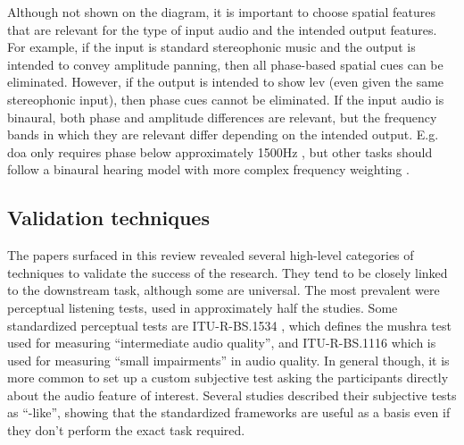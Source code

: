 \documentclass[referee,pdflatex,sn-mathphys-num]{sn-jnl}%
\newcommand{\q}[1]{\enquote{#1}}
\begin{document}
Although not shown on the diagram, it is important to choose spatial features that are relevant for the type of input audio and the intended output features. For example, if the input is standard stereophonic music and the output is intended to convey amplitude panning, then all phase-based spatial cues can be eliminated. However, if the output is intended to show \gls{lev} (even given the same stereophonic input), then phase cues cannot be eliminated. If the input audio is binaural, both phase and amplitude differences are relevant, but the frequency bands in which they are relevant differ depending on the intended output. E.g. \gls{doa} only requires phase below approximately 1500Hz \cite{morinagaEvaluationMethodCoded}, but other tasks should follow a binaural hearing model with more complex frequency weighting \cite{schaferExtensionPEAQMeasure2013,nowakQualityAssessmentSpherical2019}.


\subsection{Validation techniques}
\label{sec:validation_techniques}

The papers surfaced in this review revealed several high-level categories of techniques to validate the success of the research. They tend to be closely linked to the downstream task, although some are universal. The most prevalent were perceptual listening tests, used in approximately half the studies. Some standardized perceptual tests are ITU-R-BS.1534 \cite{itu-r-bs-1534_MUSHRA}, which defines the \gls{mushra} test used for measuring \q{intermediate audio quality}, and ITU-R-BS.1116 \cite{itu-r-bs.1116-1MethodsSubjectiveAssessment1997} which is used for measuring \q{small impairments} in audio quality. In general though, it is more common to set up a custom subjective test asking the participants directly about the audio feature of interest. Several studies \cite{gunnarssonSpectralCorrectionAudio2024,gunnarssonPracticalMethodHRTF2022,madmoniEffectPartialTimeFrequency2021,arthisSpatiogramPhaseBased2021} described their subjective tests as \q{-like}, showing that the standardized frameworks are useful as a basis even if they don't perform the exact task required.
\end{document}
